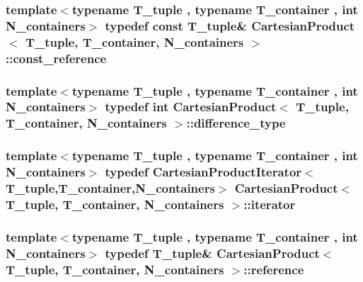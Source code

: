 \subsubsection[{const\+\_\+reference}]{\setlength{\rightskip}{0pt plus 5cm}template$<$typename T\+\_\+tuple , typename T\+\_\+container , int N\+\_\+containers$>$ typedef const T\+\_\+tuple\& {\bf Cartesian\+Product}$<$ T\+\_\+tuple, T\+\_\+container, N\+\_\+containers $>$\+::{\bf const\+\_\+reference}}\label{classCartesianProduct_a4dfd93cd4286d19c22217de7c5518be7}
\hypertarget{classCartesianProduct_a2a7b0c4ea3de70992be674b51c9833e1}{}
\subsubsection[{difference\+\_\+type}]{\setlength{\rightskip}{0pt plus 5cm}template$<$typename T\+\_\+tuple , typename T\+\_\+container , int N\+\_\+containers$>$ typedef int {\bf Cartesian\+Product}$<$ T\+\_\+tuple, T\+\_\+container, N\+\_\+containers $>$\+::{\bf difference\+\_\+type}}\label{classCartesianProduct_a2a7b0c4ea3de70992be674b51c9833e1}
\hypertarget{classCartesianProduct_ad09a4b0d85a53d95634642e3cc3560ce}{}
\subsubsection[{iterator}]{\setlength{\rightskip}{0pt plus 5cm}template$<$typename T\+\_\+tuple , typename T\+\_\+container , int N\+\_\+containers$>$ typedef {\bf Cartesian\+Product\+Iterator}$<$T\+\_\+tuple,T\+\_\+container,N\+\_\+containers$>$ {\bf Cartesian\+Product}$<$ T\+\_\+tuple, T\+\_\+container, N\+\_\+containers $>$\+::{\bf iterator}}\label{classCartesianProduct_ad09a4b0d85a53d95634642e3cc3560ce}
\hypertarget{classCartesianProduct_af4731e9a8b090b881429d82b73b86f69}{}
\subsubsection[{reference}]{\setlength{\rightskip}{0pt plus 5cm}template$<$typename T\+\_\+tuple , typename T\+\_\+container , int N\+\_\+containers$>$ typedef T\+\_\+tuple\& {\bf Cartesian\+Product}$<$ T\+\_\+tuple, T\+\_\+container, N\+\_\+containers $>$\+::{\bf reference}}\label{classCartesianProduct_af4731e9a8b090b881429d82b73b86f69}
\hypertarget{classCartesianProduct_a74086bf2f3ee647ed66791e7f8faa833}{}
